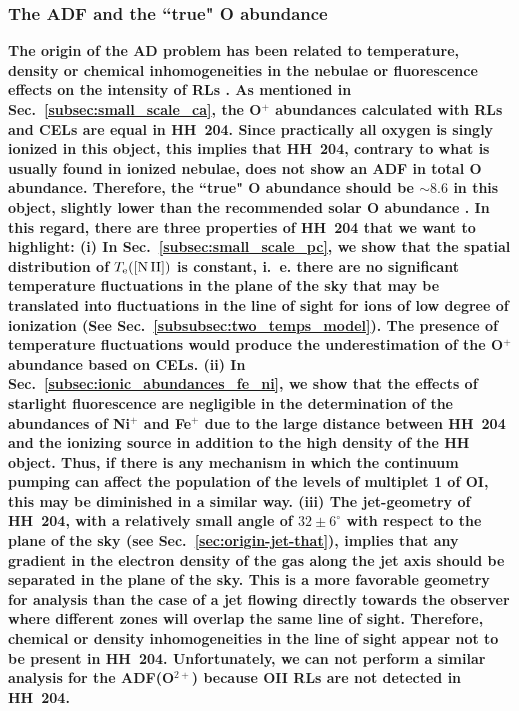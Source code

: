 \documentclass[twocolumn,linenumbers]{aastex63}
\begin{document}
\subsubsection{The ADF and the ``true" O abundance}
\label{subsubsec:ADF_and_O}


{\bf The origin of the AD problem has been related to  temperature, density or chemical inhomogeneities in the nebulae or fluorescence effects on the intensity of RLs \citep[see ][and references therein]{Peimbert67, torrespeimbert80, liu01, Pequignot91, garciarojas07,Escalante12}. As mentioned in Sec.~\ref{subsec:small_scale_ca}, the O$^+$ abundances calculated with RLs and CELs are equal in HH~204. 
Since practically all oxygen is singly ionized in this object, this implies that HH~204, contrary to what is usually found in ionized nebulae, does not show an ADF in total O abundance. Therefore, the ``true" O abundance  should be $\sim 8.6$ in this object, slightly lower  than the recommended solar O abundance \citep[$8.73 \pm 0.07$,][]{lodders19}. In this regard, there are three properties of HH~204 that we want to highlight: (i) In Sec.~\ref{subsec:small_scale_pc}, we show that the spatial distribution of $T_{\rm e}(\text{[N\thinspace II]})$ is constant, i.~e. there are no significant temperature fluctuations in the plane of the sky that may be translated into fluctuations in the line of sight for ions of low degree of ionization (See Sec.~\ref{subsubsec:two_temps_model}). The presence of temperature fluctuations would produce the underestimation of the O$^+$ abundance based on CELs. (ii) In Sec.~\ref{subsec:ionic_abundances_fe_ni}, we show that the effects of starlight fluorescence are negligible in the determination of the abundances of Ni$^{+}$ and Fe$^{+}$ due to the large distance between HH~204 and the ionizing source in addition to the high density of the HH object. Thus, if there is any mechanism in which the continuum pumping can affect the population of the levels of multiplet 1 of O\thinspace I, this may be diminished in a similar way. (iii) The jet-geometry of HH~204, with a relatively small angle of $ 32 \pm 6 ^{\circ}$ with respect to the plane of the sky (see Sec.~\ref{sec:origin-jet-that}), implies that any gradient in the electron density of the gas along the jet axis should be separated in the plane of the sky. This is a more favorable geometry for analysis than the case of a jet flowing directly towards the observer where different zones will overlap the same line of sight. Therefore, chemical or density inhomogeneities in the line of sight appear not to be present in HH~204. Unfortunately, we can not perform a similar analysis for the ADF(O$^{2+}$) because O\thinspace II RLs are not detected in HH~204. }
\end{document}
